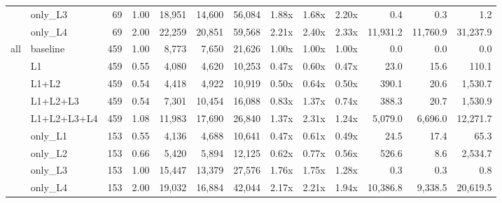 \begin{tabular}{llrrrrrrrrrrr}
 & only\_L3 & 69 & 1.00 & 18,951 & 14,600 & 56,084 & 1.88x & 1.68x & 2.20x & 0.4 & 0.3 & 1.2 \\
 & only\_L4 & 69 & 2.00 & 22,259 & 20,851 & 59,568 & 2.21x & 2.40x & 2.33x & 11,931.2 & 11,760.9 & 31,237.9 \\
\midrule
all & baseline & 459 & 1.00 & 8,773 & 7,650 & 21,626 & 1.00x & 1.00x & 1.00x & 0.0 & 0.0 & 0.0 \\
 & L1 & 459 & 0.55 & 4,080 & 4,620 & 10,253 & 0.47x & 0.60x & 0.47x & 23.0 & 15.6 & 110.1 \\
 & L1+L2 & 459 & 0.54 & 4,418 & 4,922 & 10,919 & 0.50x & 0.64x & 0.50x & 390.1 & 20.6 & 1,530.7 \\
 & L1+L2+L3 & 459 & 0.54 & 7,301 & 10,454 & 16,088 & 0.83x & 1.37x & 0.74x & 388.3 & 20.7 & 1,530.9 \\
 & L1+L2+L3+L4 & 459 & 1.08 & 11,983 & 17,690 & 26,840 & 1.37x & 2.31x & 1.24x & 5,079.0 & 6,696.0 & 12,271.7 \\
 & only\_L1 & 153 & 0.55 & 4,136 & 4,688 & 10,641 & 0.47x & 0.61x & 0.49x & 24.5 & 17.4 & 65.3 \\
 & only\_L2 & 153 & 0.66 & 5,420 & 5,894 & 12,125 & 0.62x & 0.77x & 0.56x & 526.6 & 8.6 & 2,534.7 \\
 & only\_L3 & 153 & 1.00 & 15,447 & 13,379 & 27,576 & 1.76x & 1.75x & 1.28x & 0.3 & 0.3 & 0.8 \\
 & only\_L4 & 153 & 2.00 & 19,032 & 16,884 & 42,044 & 2.17x & 2.21x & 1.94x & 10,386.8 & 9,338.5 & 20,619.5 \\
\bottomrule
\end{tabular}
